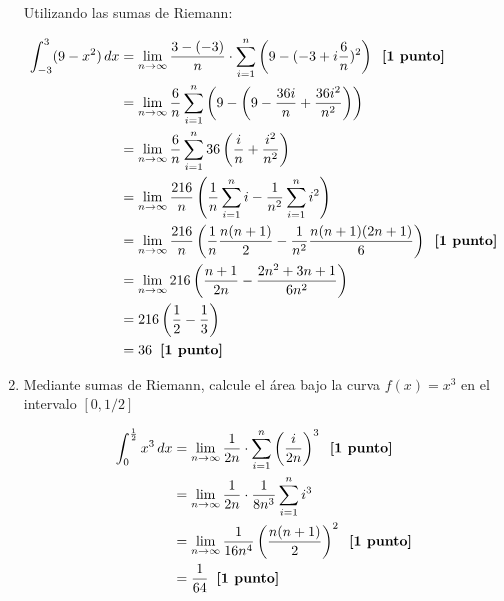 \documentclass[a4paper,10pt]{article}
\newcommand{\dis}{\displaystyle}
\begin{document}
\begin{enumerate}
Utilizando las sumas de Riemann:

\begin{align*}
  \dis  \displaystyle \int_{-3}^3 (9-x^2) \, dx  &=  \displaystyle\lim_{n \to \infty } \frac{3-(-3)}{n} \cdot \sum_{i=1}^n \left(9 - (-3+i\frac{6}{n})^2\right) \hspace{2mm} \textbf{[1 punto]} \\
    \dis    &=  \displaystyle\lim_{n \to \infty } \frac{6}{n}\sum_{i=1}^n \left(9 - \left(9-\frac{36i}{n}+\frac{36i^2}{n^2}\right)\right)\\
    \dis    &=  \displaystyle\lim_{n \to \infty } \frac{6}{n}\sum_{i=1}^n 36\left(\frac{i}{n}+\frac{i^2}{n^2}\right)\\
    \dis    &=  \displaystyle\lim_{n \to \infty } \frac{216}{n}\left( \frac{1}{n} \sum_{i=1}^n i - \frac{1}{n^2} \sum_{i=1}^n i^2\right) \\
\dis    &=  \displaystyle\lim_{n \to \infty } \frac{216}{n}\left( \frac{1}{n} \frac{n(n+1)}{2} - \frac{1}{n^2} \frac{n(n+1)(2n+1)}{6}\right) \hspace{2mm} \textbf{[1 punto]} \\
\dis    &=  \displaystyle\lim_{n \to \infty } 216\left( \frac{n+1}{2n} - \frac{2n^2+3n+1}{6n^2}\right)\\
\dis    &=   216\left( \frac{1}{2} - \frac{1}{3}\right)\\
\dis    &=   36 \hspace{2mm} \textbf{[1 punto]}
\end{align*}


\newpage
\item Mediante sumas de Riemann, calcule el área bajo la curva $f(x) = x^3$ en el intervalo $[0,1/2]$

\begin{align*}
  \dis  \displaystyle \int_{0}^{\frac{1}{2}} x^3 \, dx  &=  \displaystyle\lim_{n \to \infty } \frac{1}{2n} \cdot \sum_{i=1}^n \left( \frac{i}{2n} \right)^3 \hspace{2mm} \textbf{[1 punto]} \\
    \dis    &=  \displaystyle\lim_{n \to \infty } \frac{1}{2n} \cdot \frac{1}{8n^3}\sum_{i=1}^n i^3\\
\dis    &=  \displaystyle\lim_{n \to \infty } \frac{1}{16n^4} \left(\frac{n(n+1)}{2}\right)^2 \hspace{2mm} \textbf{[1 punto]} \\
\dis    &=  \frac{1}{64} \hspace{2mm} \textbf{[1 punto]}
\end{align*}


\end{enumerate}




\vspace{10mm}
\end{document}
